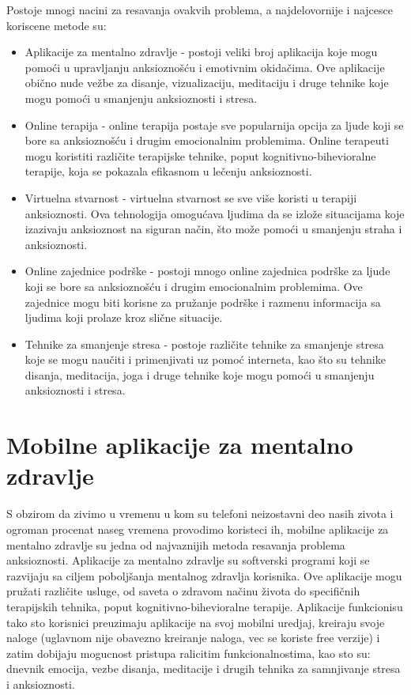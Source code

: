 \documentclass[a4paper]{article}
\begin{document}
Postoje mnogi nacini za resavanja ovakvih problema, a najdelovornije i najcesce koriscene metode su:

\begin{itemize}
\item Aplikacije za mentalno zdravlje - postoji veliki broj aplikacija koje mogu pomoći u upravljanju anksioznošću i emotivnim okidačima. Ove aplikacije obično nude vežbe za disanje, vizualizaciju, meditaciju i druge tehnike koje mogu pomoći u smanjenju anksioznosti i stresa.
\item Online terapija - online terapija postaje sve popularnija opcija za ljude koji se bore sa anksioznošću i drugim emocionalnim problemima. Online terapeuti mogu koristiti različite terapijske tehnike, poput kognitivno-bihevioralne terapije, koja se pokazala efikasnom u lečenju anksioznosti.
      
\item Virtuelna stvarnost - virtuelna stvarnost se sve više koristi u terapiji anksioznosti. Ova tehnologija omogućava ljudima da se izlože situacijama koje izazivaju anksioznost na siguran način, što može pomoći u smanjenju straha i anksioznosti.

\item Online zajednice podrške - postoji mnogo online zajednica podrške za ljude koji se bore sa anksioznošću i drugim emocionalnim problemima. Ove zajednice mogu biti korisne za pružanje podrške i razmenu informacija sa ljudima koji prolaze kroz slične situacije.

\item Tehnike za smanjenje stresa - postoje različite tehnike za smanjenje stresa koje se mogu naučiti i primenjivati uz pomoć interneta, kao što su tehnike disanja, meditacija, joga i druge tehnike koje mogu pomoći u smanjenju anksioznosti i stresa.
\end{itemize} 


\section{Mobilne aplikacije za mentalno zdravlje}
\label{sec:mobilneAplikacije}
S obzirom da zivimo u vremenu u kom su telefoni neizostavni deo nasih zivota i ogroman procenat naseg vremena provodimo koristeci ih, mobilne aplikacije za mentalno zdravlje su jedna od najvaznijih metoda resavanja problema anksioznosti.
Aplikacije za mentalno zdravlje su softverski programi koji se razvijaju sa ciljem poboljšanja mentalnog zdravlja korisnika. Ove aplikacije mogu pružati različite usluge, od saveta o zdravom načinu života do specifičnih terapijskih tehnika, poput kognitivno-bihevioralne terapije. 
Aplikacije funkcionisu tako sto korisnici preuzimaju aplikacije na svoj mobilni uredjaj, kreiraju svoje naloge (uglavnom nije obavezno kreiranje naloga, vec se koriste free verzije) i zatim dobijaju mogucnost pristupa ralicitim funkcionalnostima, kao sto su: dnevnik emocija, vezbe disanja, meditacije i drugih tehnika za samnjivanje stresa i anksioznosti. 
\end{document}

